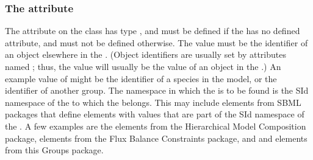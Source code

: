 \subsubsection{The \fixttspace{} attribute}
\label{member-idref-attribute}

The attribute  on the \Member class has type , and must be defined if the \Member has no defined  attribute, and must not be defined otherwise.  The value must be the identifier of an object elsewhere in the \Model.  (Object identifiers are usually set by attributes named ; thus, the  value will usually be the  value of an object in the \Model.)  An example value of  might be the identifier of a species in the model, or the identifier of another group.  The namespace in which the  is to be found is the SId namespace of the \Model to which the \Group belongs.  This may include elements from SBML packages that define elements with  values that are part of the SId namespace of the \Model.  A few examples are the \Deletion elements from the  Hierarchical Model Composition package, \FluxBound elements from the Flux Balance Constraints package, and \Group and \Member elements from this Groups package.

